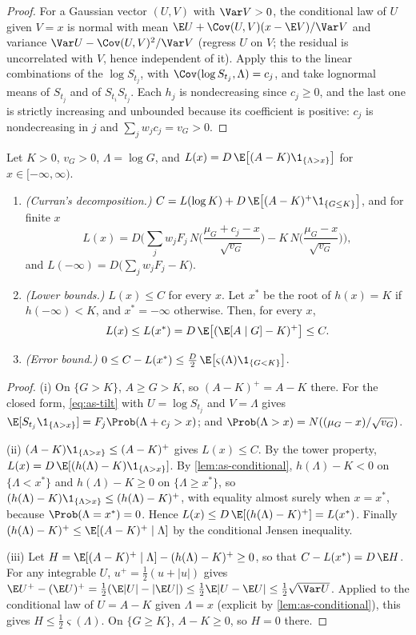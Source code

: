 \begin{proof}
For a Gaussian vector $(U,V)$ with $\Var V>0$, the conditional law of $U$ given $V=x$ is
normal with mean $\E U+\Cov(U,V)(x-\E V)/\Var V$ and variance $\Var U-\Cov(U,V)^2/\Var V$
(regress $U$ on $V$; the residual is uncorrelated with $V$, hence independent of it). Apply this to the linear
combinations of the $\log S_{t_j}$, with $\Cov(\log S_{t_j},\Lambda)=c_j$, and take lognormal
means of $S_{t_j}$ and of $S_{t_i}S_{t_j}$. Each $h_j$ is nondecreasing since $c_j\ge0$, and the
last one is strictly increasing and unbounded because its coefficient is positive: $c_j$ is
nondecreasing in $j$ and $\sum_jw_jc_j=v_G>0$.
\end{proof}

\begin{proposition}\label{prop:as-curran}
Let $K>0$, $v_G>0$, $\Lambda=\log G$, and $L(x)=D\,\E\big[(A-K)\1_{\{\Lambda>x\}}\big]$ for
$x\in[-\infty,\infty)$.
\begin{enumerate}[label=(\roman*)]
  \item \emph{(Curran's decomposition.)} $C=L(\log K)+D\,\E\big[(A-K)^+\1_{\{G\le K\}}\big]$, and
    for finite $x$
    \[
      L(x)=D\Big(\sum_jw_jF_j\,N\Big(\frac{\mu_G+c_j-x}{\sqrt{v_G}}\Big)-K\,N\Big(\frac{\mu_G-x}{\sqrt{v_G}}\Big)\Big),
    \]
    and $L(-\infty)=D\big(\sum_jw_jF_j-K\big)$.
  \item \emph{(Lower bounds.)} $L(x)\le C$ for every $x$. Let $x^*$ be the root of
    $h(x)=K$ if $h(-\infty)<K$, and $x^*=-\infty$ otherwise. Then, for every $x$,
    \[
      L(x)\le L(x^*)=D\,\E\big[(\E[A\mid G]-K)^+\big]\le C .
    \]
  \item \emph{(Error bound.)} $0\le C-L(x^*)\le\frac D2\,\E\big[\varsigma(\Lambda)\1_{\{G<K\}}\big]$.
\end{enumerate}
\end{proposition}

\begin{proof}
(i) On $\{G>K\}$, $A\ge G>K$, so $(A-K)^+=A-K$ there. For the closed form,
\eqref{eq:as-tilt} with $U=\log S_{t_j}$ and $V=\Lambda$ gives
$\E[S_{t_j}\1_{\{\Lambda>x\}}]=F_j\Prob(\Lambda+c_j>x)$; and
$\Prob(\Lambda>x)=N((\mu_G-x)/\sqrt{v_G})$.

(ii) $(A-K)\1_{\{\Lambda>x\}}\le(A-K)^+$ gives $L(x)\le C$. By the tower property,
$L(x)=D\,\E[(h(\Lambda)-K)\1_{\{\Lambda>x\}}]$. By \cref{lem:as-conditional}, $h(\Lambda)-K<0$ on
$\{\Lambda<x^*\}$ and $h(\Lambda)-K\ge0$ on $\{\Lambda\ge x^*\}$, so
$(h(\Lambda)-K)\1_{\{\Lambda>x\}}\le(h(\Lambda)-K)^+$, with equality almost surely when $x=x^*$,
because $\Prob(\Lambda=x^*)=0$. Hence $L(x)\le D\,\E[(h(\Lambda)-K)^+]=L(x^*)$. Finally
$(h(\Lambda)-K)^+\le\E[(A-K)^+\mid\Lambda]$ by the conditional Jensen inequality.

(iii) Let $H=\E[(A-K)^+\mid\Lambda]-(h(\Lambda)-K)^+\ge0$, so that $C-L(x^*)=D\,\E H$. For any
integrable $U$, $u^+=\frac12(u+|u|)$ gives
$\E U^+-(\E U)^+=\frac12(\E|U|-|\E U|)\le\frac12\E|U-\E U|\le\frac12\sqrt{\Var U}$.
Applied to the conditional law of $U=A-K$ given $\Lambda=x$ (explicit by \cref{lem:as-conditional}),
this gives $H\le\frac12\varsigma(\Lambda)$. On $\{G\ge K\}$, $A-K\ge0$, so $H=0$ there.
\end{proof}

